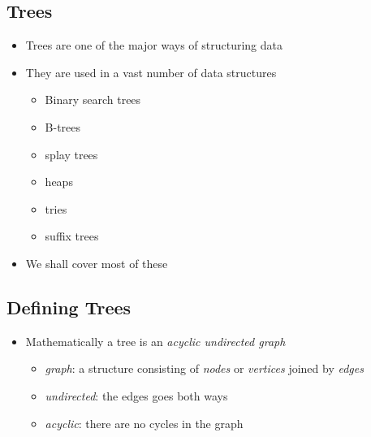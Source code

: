 \begin{slide}
\section{Trees}

\begin{PauseHighLight}
\begin{itemize}
\item Trees are one of the major ways of structuring data\pause
\item They are used in a vast number of data structures
  \begin{itemize}\squeeze
  \item Binary search trees
  \item B-trees
  \item splay trees
  \item heaps
  \item tries
  \item suffix trees\pause
  \end{itemize}
\item We shall cover most of these\pause
\end{itemize}
\end{PauseHighLight}
\end{slide}


\begin{slide}
\section{Defining Trees}

\begin{PauseHighLight}
  \begin{itemize}
  \item Mathematically a tree is an \emph{acyclic undirected
      graph}\pause
    \begin{itemize}
    \item \emph{graph}: a structure consisting of \emph{nodes} or
      \emph{vertices} joined by \emph{edges}\pause
    \item \emph{undirected}: the edges goes both ways\pause
    \item \emph{acyclic}: there are no cycles in the graph\pause
    \end{itemize}
  \end{itemize}
  \begin{center}
    \pause
  \end{center}
\end{PauseHighLight}
\end{slide}

